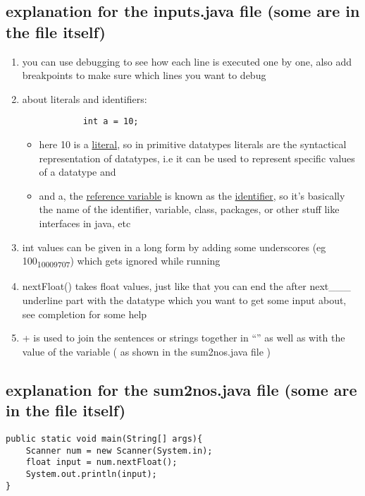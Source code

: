 \documentclass[11pt]{article}
\begin{document}
\subsection{explanation for the inputs.java file (some are in the file itself)}
\label{sec:orgc309dd5}
\begin{enumerate}
\item you can use debugging to see how each line is executed one by one, also add breakpoints to make sure which lines you want to debug
\item about literals and identifiers:
\begin{verbatim}
            int a = 10;
\end{verbatim}
\begin{itemize}
\item here 10 is a \uline{literal}, so in primitive datatypes literals are the syntactical representation of datatypes, i.e it can be used to represent specific values of a datatype and
\item and a, the \uline{reference variable} is known as the \uline{identifier}, so it's basically the name of the identifier, variable, class, packages, or other stuff like interfaces in java, etc
\end{itemize}
\item int values can be given in a long form by adding some underscores (eg 100\textsubscript{100}\textsubscript{09707}) which gets ignored while running
\item nextFloat() takes float values, just like that you can end the after next\_\_\_ underline part with the datatype which you want to get some input about, see completion for some help
\item + is used to join the sentences or strings together in ``'' as well as with the value of the variable ( as shown in the sum2nos.java file )
\end{enumerate}
\subsection{explanation for the sum2nos.java file (some are in the file itself)}
\label{sec:org62d84f1}
\begin{verbatim}
public static void main(String[] args){
    Scanner num = new Scanner(System.in);
    float input = num.nextFloat();
    System.out.println(input);
}
\end{verbatim}
\end{document}
